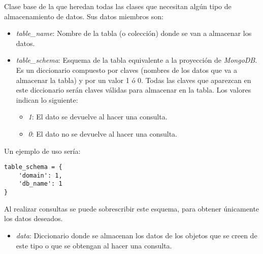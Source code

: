 Clase base de la que heredan todas las clases que necesitan algún tipo de almacenamiento de datos. Sus datos miembros son:
\begin{itemize}
	\item \textit{table\_name}: Nombre de la tabla (o colección) donde se van a almacenar los datos.
	\item \textit{table\_schema}: Esquema de la tabla equivalente a la proyección de \textit{MongoDB}. Es un diccionario compuesto por claves (nombres de los datos que va a almacenar la tabla) y por un valor 1 ó 0. Todas las claves que aparezcan en este diccionario serán claves válidas para almacenar en la tabla. Los valores indican lo siguiente:
	\begin{itemize}
		\item \textit{1}: El dato se devuelve al hacer una consulta.
		\item \textit{0}: El dato no se devuelve al hacer una consulta.
	\end{itemize}
\end{itemize}

\bigskip
Un ejemplo de uso sería:

\begin{lstlisting}
table_schema = {
	'domain': 1,
	'db_name': 1
}
\end{lstlisting}

\bigskip
Al realizar consultas se puede sobrescribir este esquema, para obtener únicamente los datos deseados.
\begin{itemize}
	\item \textit{data}: Diccionario donde se almacenan los datos de los objetos que se creen de este tipo o que se obtengan al hacer una consulta.
\end{itemize}


